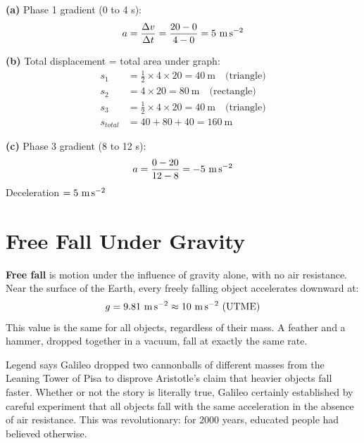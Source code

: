 \begin{solutionbox}
\textbf{(a)} Phase 1 gradient (0 to 4 s):
\[
  a = \frac{\Delta v}{\Delta t}
  = \frac{20 - 0}{4 - 0} = 5\ \text{m\,s}^{-2}
\]

\textbf{(b)} Total displacement = total area under graph:
\begin{align*}
  s_1 &= \tfrac{1}{2} \times 4 \times 20 = 40\ \text{m}
  \quad\text{(triangle)}\\
  s_2 &= 4 \times 20 = 80\ \text{m}
  \quad\text{(rectangle)}\\
  s_3 &= \tfrac{1}{2} \times 4 \times 20 = 40\ \text{m}
  \quad\text{(triangle)}\\
  s_{total} &= 40 + 80 + 40 = 160\ \text{m}
\end{align*}

\textbf{(c)} Phase 3 gradient (8 to 12 s):
\[
  a = \frac{0 - 20}{12 - 8} = -5\ \text{m\,s}^{-2}
\]
Deceleration $= 5\ \text{m\,s}^{-2}$
\end{solutionbox}

\vspace{3.3cm}

\section{Free Fall Under Gravity}

\begin{definitionbox}
\textbf{Free fall} is motion under the influence of
gravity alone, with no air resistance. Near the surface
of the Earth, every freely falling object accelerates
downward at:
\[
  g = 9.81\ \text{m\,s}^{-2}
  \approx 10\ \text{m\,s}^{-2}\ \text{(UTME)}
\]
This value is the same for all objects, regardless of
their mass. A feather and a hammer, dropped together in
a vacuum, fall at exactly the same rate.
\end{definitionbox}


\begin{historybox}
Legend says Galileo dropped two cannonballs of different
masses from the Leaning Tower of Pisa to disprove
Aristotle's claim that heavier objects fall faster.
Whether or not the story is literally true, Galileo
certainly established by careful experiment that all
objects fall with the same acceleration in the absence
of air resistance. This was revolutionary: for 2000
years, educated people had believed otherwise.
\end{historybox}

